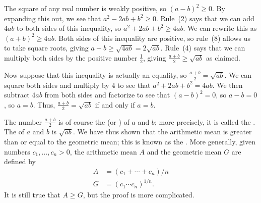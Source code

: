 \documentclass[a4paper]{book}
\theoremstyle{definition}
\renewenvironment{solution}{\SolutionInline}{\endSolutionInline}
\begin{document}
\begin{solution}
 The square of any real number is weakly positive, so
 $(a-b)^2\geq 0$.  By expanding this out, we see that
 $a^2-2ab+b^2\geq 0$.  Rule~(2) says that we can add $4ab$ to both
 sides of this inequality, so $a^2+2ab+b^2\geq 4ab$.  We can rewrite
 this as $(a+b)^2\geq 4ab$.  Both sides of this inequality are
 positive, so rule~(8) allows us to take square roots, giving
 $a+b\geq\sqrt{4ab}=2\sqrt{ab}$.  Rule~(4) says that we can multiply
 both sides by the positive number $\frac{1}{2}$, giving
 $\frac{a+b}{2}\geq\sqrt{ab}$ as claimed.

 Now suppose that this inequality is actually an equality, so
 $\frac{a+b}{2}=\sqrt{ab}$.  We can square both sides and multiply by
 $4$ to see that $a^2+2ab+b^2=4ab$.  We then subtract $4ab$ from both
 sides and factorize to see that $(a-b)^2=0$, so $a-b=0$, so $a=b$.
 Thus, $\frac{a+b}{2}=\sqrt{ab}$ if and only if $a=b$.
\end{solution}
\begin{background}
 The number $\frac{a+b}{2}$ is of course the  (or
 ) of $a$ and $b$; more precisely, it is called the
 .  The  of $a$ and $b$ is
 $\sqrt{ab}$.  We have thus shown that the arithmetic mean is greater
 than or equal to the geometric mean; this is known as the .  More generally, given numbers $c_1,\dotsc,c_n>0$, the
 arithmetic mean $A$ and the geometric mean $G$ are defined by
 \begin{align*}
  A &= (c_1 + \dotsb + c_n)/n \\
  G &= (c_1 \dotsm c_n)^{1/n}.
 \end{align*}
 It is still true that $A\geq G$, but the proof is more complicated.
\end{background}
\end{document}
